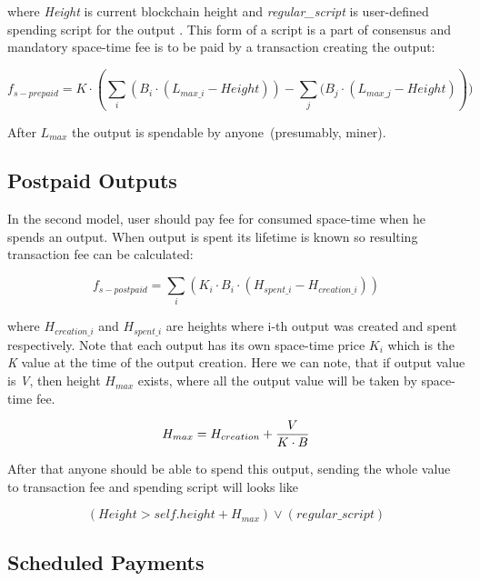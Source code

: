 \documentclass[]{article}   %
\newcommand{\authnote}[2]{\marginpar{\parbox{\marginparwidth}{\tiny %
  \textsf{#1 {\textcolor{blue}{notes: #2}}}}}%
  \textcolor{blue}{\textbf{\dag}}}
\newcommand{\authnote}[2]{
  \textsf{#1 \textcolor{blue}{: #2}}}
\newcommand{\authnote}[2]{}
\newcommand{\dnote}[1]{{\authnote{\textcolor{blue}{Dima notes}}{#1}}}
\begin{document}
where \textit{Height} is current blockchain height and \textit{regular\_script} is user-defined spending script for the output\dnote{What is self.height?}. This form of a script is a part of consensus and mandatory space-time fee is to be paid by a transaction creating the output:

\begin{equation}
f_{s-prepaid} = K \cdot (\sum_i{(B_i \cdot (L_{max\_i} - Height))} - \sum_j{(B_j \cdot (L_{max\_j} - Height)}))
\end{equation}

After $L_{max}$ the output is spendable by anyone~(presumably, miner).

\subsection{Postpaid Outputs}
\label{sec-postpaid}


In the second model, user should pay fee for consumed space-time when he spends an output. When output is spent its lifetime is known so resulting transaction fee can be calculated:

\begin{equation}
f_{s-postpaid} = \sum_i{(K_i \cdot B_i \cdot (H_{spent\_i} - H_{creation\_i}))}
\end{equation}

where $H_{creation\_i}$ and $H_{spent\_i}$ are heights where i-th output was created and spent respectively. Note that each output has its own space-time price \textit{$K_i$} which is the \textit{K} value at the time of the output creation. Here we can note, that if output value is \textit{V}, then height \textit{$H_{max}$} exists, where all the output value will be taken by space-time fee.

\begin{equation}
H_{max} = {H_{creation} + {V \over {K \cdot B}}}
\end{equation}

After that anyone should be able to spend this output, sending the whole value to transaction fee and spending script will looks like

\begin{equation}
(Height > self.height + H_{max}) \lor (regular\_script)
\end{equation}

\subsection{Scheduled Payments}
\label{sec-scheduled}
\end{document}

